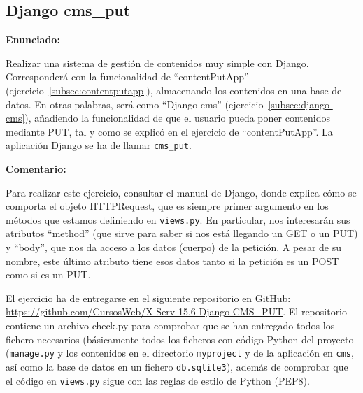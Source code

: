 %


\subsection{Django cms\_put}
\label{subsec:django-cms-put}

\textbf{Enunciado:}

Realizar una sistema de gestión de contenidos muy simple con Django. Corresponderá con la funcionalidad de ``contentPutApp'' (ejercicio~\ref{subsec:contentputapp}), almacenando los contenidos en una base de datos. En otras palabras, será como ``Django cms'' (ejercicio~\ref{subsec:django-cms}), añadiendo la funcionalidad de que el usuario pueda poner contenidos mediante PUT, tal y como se explicó en el ejercicio de ``contentPutApp''. La aplicación Django se ha de llamar \texttt{cms\_put}.


\textbf{Comentario:}

Para realizar este ejercicio, consultar el manual de Django, donde explica cómo se comporta el objeto HTTPRequest, que es siempre primer argumento en los métodos que estamos definiendo en \texttt{views.py}. En particular, nos interesarán sus atributos ``method'' (que sirve para saber si nos está llegando un GET o un PUT) y ``body'', que nos da acceso a los datos (cuerpo) de la petición. A pesar de su nombre, este último atributo tiene esos datos tanto si la petición es un POST como si es un PUT. 

El ejercicio ha de entregarse en el siguiente repositorio en GitHub: 
\url{https://github.com/CursosWeb/X-Serv-15.6-Django-CMS_PUT}. El repositorio contiene
un archivo check.py para comprobar que se han entregado todos los fichero necesarios (básicamente todos los ficheros con código Python del proyecto (\texttt{manage.py} y los contenidos en el directorio \texttt{myproject} y de la aplicación en \texttt{cms}, así como la base de datos en un fichero \texttt{db.sqlite3}), además de comprobar que el código en
\texttt{views.py} sigue con las reglas de estilo de Python (PEP8).

%

